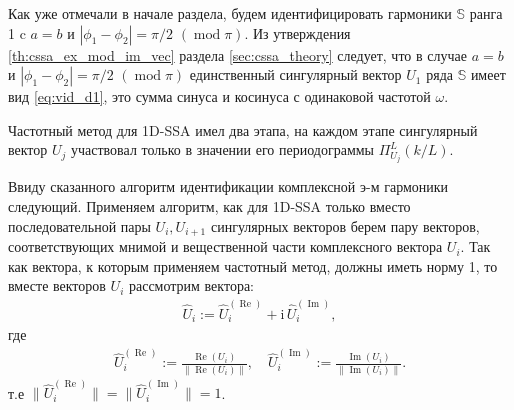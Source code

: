 \documentclass[specialist,
               substylefile = spbu.rtx,
               subf,href,colorlinks=true, 12pt]{disser}
\def\RE{\mathop{\mathrm{Re}}}
\def\mod{\mathop{\mathrm{mod}}}
\def\IM{\mathop{\mathrm{Im}}}
\newcommand{\I}{\mathrm{i}}
\begin{document}
Как уже отмечали в начале раздела, будем идентифицировать гармоники $\mathbb{S}$ ранга 1 c $a=b$ и $|\phi_1 - \phi_2| = \pi/2 \,\,(\mod \pi)$.
 Из утверждения \ref{th:cssa_ex_mod_im_vec} раздела \ref{sec:cssa_theory} следует, что в случае $a=b$ и $|\phi_1 - \phi_2| = \pi/2 \,\,(\mod \pi)$ единственный сингулярный вектор $U_1$ ряда $\mathbb{S}$ имеет вид \eqref{eq:vid_d1}, это сумма синуса и косинуса с одинаковой частотой $\omega$.

Частотный метод для 1D-SSA имел два этапа, на каждом этапе сингулярный вектор $U_j$ участвовал только в значении его периодограммы $\Pi_{U_j}^L(k/L)$.

Ввиду сказанного алгоритм идентификации комплексной э-м гармоники следующий. Применяем алгоритм, как для 1D-SSA только вместо последовательной пары $U_i, U_{i+1}$ сингулярных векторов берем пару векторов, соответствующих мнимой и вещественной части  комплексного вектора $U_i$.
Так как вектора, к которым применяем частотный метод, должны иметь норму 1, то вместе векторов $U_i$ рассмотрим вектора: 
\begin{gather*}
\widehat{U}_{i} := \widehat{U}^{(\RE)}_{i} +  \I \,\widehat{U}^{(\IM)}_{i},
\end{gather*}
где
\begin{gather*} \label{eq:V_norm_mssa}
\widehat{U}^{(\RE)}_{i}:= \frac{\RE(U_i)}{\|\RE(U_i) \|}, \quad \widehat{U}^{(\IM)}_{i}:= \frac{\IM(U_i)}{\|\IM(U_i) \|}.
\end{gather*}
т.е $\| \widehat{U}^{(\RE)}_{i}\| = \| \widehat{U}^{(\IM)}_{i} \| = 1$. 
\end{document}
